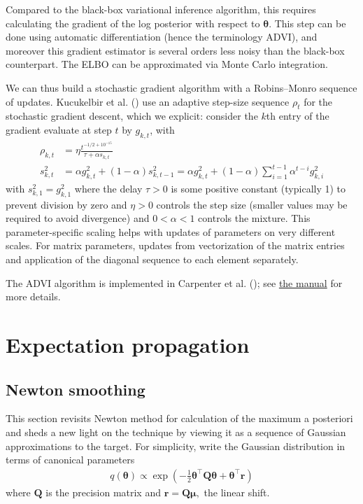 \documentclass[
  11pt,
  letterpaper,
]{scrbook}
\theoremstyle{definition}
\theoremstyle{plain}
\theoremstyle{plain}
\theoremstyle{plain}
\theoremstyle{definition}
\theoremstyle{definition}
\theoremstyle{plain}
\theoremstyle{plain}
\theoremstyle{remark}
\begin{document}
Compared to the black-box variational inference algorithm, this requires
calculating the gradient of the log posterior with respect to
\(\boldsymbol{\theta}.\) This step can be done using automatic
differentiation (hence the terminology ADVI), and moreover this gradient
estimator is several orders less noisy than the black-box counterpart.
The ELBO can be approximated via Monte Carlo integration.

We can thus build a stochastic gradient algorithm with a Robins--Monro
sequence of updates. Kucukelbir et al.
() use an adaptive step-size
sequence \(\rho_t\) for the stochastic gradient descent, which we
explicit: consider the \(k\)th entry of the gradient evaluate at step
\(t\) by \(g_{k,t}\), with \begin{align*}
\rho_{k,t} &= \eta\frac{ t^{-1/2+10^{-15}}}{\tau + \alpha s_{k,t}} \\
s^2_{k,t} &= \alpha g_{k,t}^2 + (1-\alpha)s^2_{k,t-1} = 
\alpha g_{k,t}^2 + (1-\alpha)\sum_{i=1}^{t-1} \alpha^{t-i} g_{k,i}^2 
\end{align*} with \(s^2_{k,1}=g_{k,1}^2\) where the delay \(\tau>0\) is
some positive constant (typically 1) to prevent division by zero and
\(\eta>0\) controls the step size (smaller values may be required to
avoid divergence) and \(0<\alpha<1\) controls the mixture. This
parameter-specific scaling helps with updates of parameters on very
different scales. For matrix parameters, updates from vectorization of
the matrix entries and application of the diagonal sequence to each
element separately.

The ADVI algorithm is implemented in Carpenter et al.
(); see
\href{https://mc-stan.org/docs/reference-manual/variational.html}{the
manual} for more details.


\chapter{Expectation propagation}\label{expectation-propagation}

\section{Newton smoothing}\label{newton-smoothing}

This section revisits Newton method for calculation of the maximum a
posteriori and sheds a new light on the technique by viewing it as a
sequence of Gaussian approximations to the target. For simplicity, write
the Gaussian distribution in terms of canonical parameters
\begin{align*}
 q(\boldsymbol{\theta}) \propto \exp \left( - \frac{1}{2} \boldsymbol{\theta}^\top \mathbf{Q}\boldsymbol{\theta} + \boldsymbol{\theta}^\top \boldsymbol{r}\right)
\end{align*} where \(\mathbf{Q}\) is the precision matrix and
\(\boldsymbol{r}=\mathbf{Q}\boldsymbol{\mu},\) the linear shift.
\end{document}

